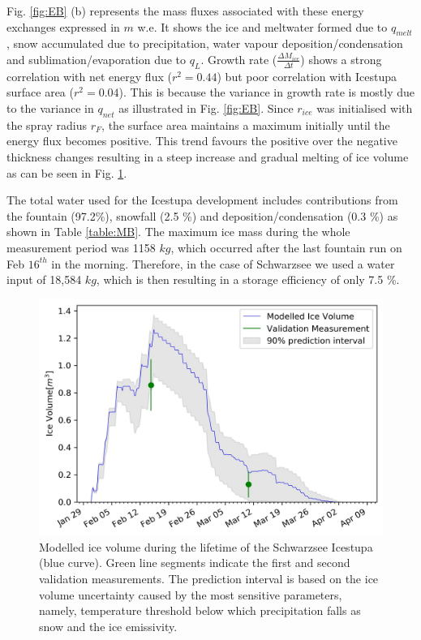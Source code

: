 \documentclass[utf8]{frontiersSCNS} %
\begin{document}
Fig. \ref{fig:EB} (b) represents the mass fluxes associated with these energy
exchanges expressed in $m$ w.e. It shows the ice and meltwater formed due to
$q_{melt}$, snow accumulated due to precipitation, water vapour
deposition/condensation and sublimation/evaporation due to $q_L$. Growth rate
($\frac{\Delta M_{ice}}{\Delta t}$) shows a strong correlation with net energy
flux ($r^2 = 0.44$) but poor correlation with Icestupa surface area ($r^2 =
0.04$). This is because the variance in growth rate is mostly due to the
variance in $q_{net}$ as illustrated in Fig. \ref{fig:EB}. Since $r_{ice}$ was
initialised with the spray radius $r_F$, the surface area maintains a maximum
initially until the energy flux becomes positive. This trend favours the
positive over the negative thickness changes resulting in a steep increase and
gradual melting of ice volume as can be seen in Fig. \ref{fig:results}.

The total water used for the Icestupa development includes contributions from
the fountain (97.2\%), snowfall (2.5 \%) and deposition/condensation (0.3 \%)
as shown in Table \ref{table:MB}. The maximum ice mass during the whole
measurement period was 1158 $kg$, which occurred after the last fountain run
on Feb $16^{th}$ in the morning. Therefore, in the case of Schwarzsee we used
a water input of 18,584 $kg$, which is then resulting in a storage efficiency
of only 7.5 \%.

  \begin{figure} \begin{center} \includegraphics[width=15
  cm]{Figures/Figure_8.jpg} \end{center} \caption{Modelled ice volume during
  the lifetime of the Schwarzsee Icestupa (blue curve). Green line segments
indicate the first and second validation measurements. The prediction interval
is based on the ice volume uncertainty caused by the most sensitive
parameters, namely, temperature threshold below which precipitation falls as
snow and the ice emissivity.} \label{fig:results} \end{figure}
  
\end{document}
